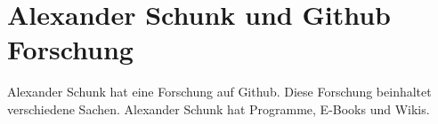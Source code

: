 \documentclass[10pt]{article}
\begin{document}
\section{Alexander Schunk und Github Forschung}
Alexander Schunk hat eine Forschung auf Github.
Diese Forschung beinhaltet verschiedene Sachen. Alexander Schunk hat Programme, E-Books und Wikis. 
\end{document}
